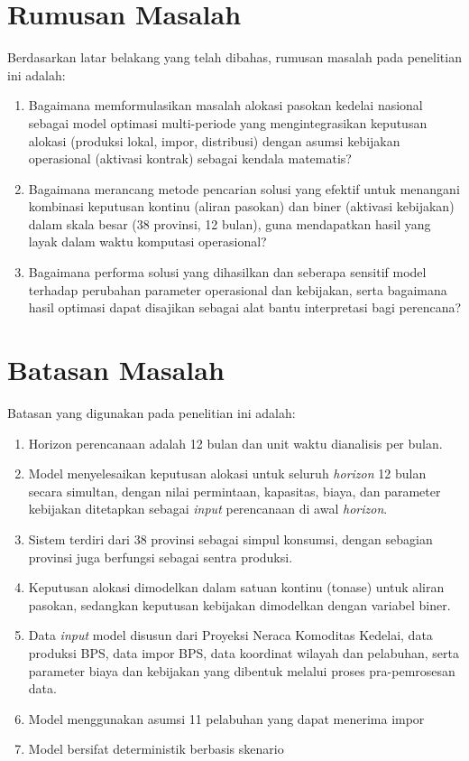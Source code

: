 \documentclass{file/TA-ITS}
\theoremstyle{definition}
\theoremstyle{definition}
\theoremstyle{plain}
\begin{document}
\section{Rumusan Masalah}
Berdasarkan latar belakang yang telah dibahas, rumusan masalah pada penelitian ini adalah:
\begin{enumerate}
    \item Bagaimana memformulasikan masalah alokasi pasokan kedelai nasional sebagai model optimasi multi-periode yang mengintegrasikan keputusan alokasi (produksi lokal, impor, distribusi) dengan asumsi kebijakan operasional (aktivasi kontrak) sebagai kendala matematis?
    
    \item Bagaimana merancang metode pencarian solusi yang efektif untuk menangani kombinasi keputusan kontinu (aliran pasokan) dan biner (aktivasi kebijakan) dalam skala besar (38 provinsi, 12 bulan), guna mendapatkan hasil yang layak dalam waktu komputasi operasional?
    
    \item Bagaimana performa solusi yang dihasilkan dan seberapa sensitif model terhadap perubahan parameter operasional dan kebijakan, serta bagaimana hasil optimasi dapat disajikan sebagai alat bantu interpretasi bagi perencana?
\end{enumerate}

\section{Batasan Masalah}
Batasan yang digunakan pada penelitian ini adalah:
\begin{enumerate}
    \item Horizon perencanaan adalah 12 bulan dan unit waktu dianalisis per bulan.
    \item Model menyelesaikan keputusan alokasi untuk seluruh \textit{horizon} 12 bulan secara simultan, dengan nilai permintaan, kapasitas, biaya, dan parameter kebijakan ditetapkan sebagai \textit{input} perencanaan di awal \textit{horizon}.
    \item Sistem terdiri dari 38 provinsi sebagai simpul konsumsi, dengan sebagian provinsi juga berfungsi sebagai sentra produksi.
    \item Keputusan alokasi dimodelkan dalam satuan kontinu (tonase) untuk aliran pasokan, sedangkan keputusan kebijakan dimodelkan dengan variabel biner.
    \item Data \textit{input} model disusun dari Proyeksi Neraca Komoditas Kedelai, data produksi BPS, data impor BPS, data koordinat wilayah dan pelabuhan, serta parameter biaya dan kebijakan yang dibentuk melalui proses pra-pemrosesan data.
    \item Model menggunakan asumsi 11 pelabuhan yang dapat menerima impor
    \item Model bersifat deterministik berbasis skenario

\end{enumerate}
\end{document}

